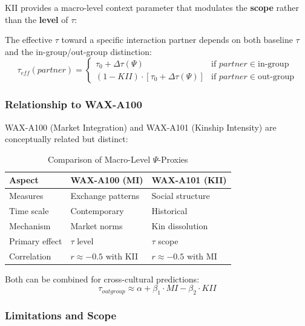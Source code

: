 KII provides a macro-level context parameter that modulates the \textbf{scope} rather than the \textbf{level} of $\tau$:

\begin{definition}
\label{def:scope-tau}
The effective $\tau$ toward a specific interaction partner depends on both baseline $\tau$ and the in-group/out-group distinction:
\begin{equation}
\tau_{eff}(partner) = \begin{cases}
\tau_0 + \Delta\tau(\Psi) & \text{if } partner \in \text{in-group} \\
(1 - KII) \cdot [\tau_0 + \Delta\tau(\Psi)] & \text{if } partner \in \text{out-group}
\end{cases}
\end{equation}
\end{definition}

\subsubsection{Relationship to WAX-A100}

WAX-A100 (Market Integration) and WAX-A101 (Kinship Intensity) are conceptually related but distinct:

\begin{table}[htbp]
\centering
\caption{Comparison of Macro-Level $\Psi$-Proxies}
\begin{tabular}{@{}lll@{}}
\toprule
\textbf{Aspect} & \textbf{WAX-A100 (MI)} & \textbf{WAX-A101 (KII)} \\
\midrule
Measures & Exchange patterns & Social structure \\
Time scale & Contemporary & Historical \\
Mechanism & Market norms & Kin dissolution \\
Primary effect & $\tau$ level & $\tau$ scope \\
Correlation & $r \approx -0.5$ with KII & $r \approx -0.5$ with MI \\
\bottomrule
\end{tabular}
\end{table}

Both can be combined for cross-cultural predictions:
\begin{equation}
\tau_{outgroup} \approx \alpha + \beta_1 \cdot MI - \beta_2 \cdot KII
\end{equation}

\subsubsection{Limitations and Scope}

